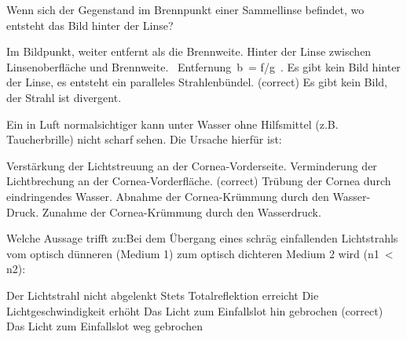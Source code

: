 \documentclass[11pt]{exam}
\begin{document}
\setlength{\voffset}{-0.5in}
\setlength{\headsep}{5pt}

\hspace{2mm}
 \hspace{5mm}
\vspace{4mm}

\begin{questions}

\question Wenn sich der Gegenstand im Brennpunkt einer Sammellinse befindet, wo entsteht das Bild hinter der Linse?

\begin{choices}
	\choice Im Bildpunkt, weiter entfernt als die Brennweite.
	\choice Hinter der Linse zwischen Linsenoberfläche und Brennweite.
	\choice  Entfernung b = f/g .
	\choice Es gibt kein Bild hinter der Linse, es entsteht ein paralleles Strahlenbündel. (correct)
	\choice Es gibt kein Bild, der Strahl ist divergent.
\end{choices}

\vspace{3mm}\question Ein in Luft normalsichtiger kann unter Wasser ohne Hilfsmittel (z.B. Taucherbrille) nicht scharf sehen. Die Ursache hierfür ist:

\begin{choices}
	\choice Verstärkung der Lichtstreuung an der Cornea-Vorderseite.
	\choice Verminderung der Lichtbrechung an der Cornea-Vorderfläche. (correct)
	\choice Trübung der Cornea durch eindringendes Wasser.
	\choice Abnahme der Cornea-Krümmung durch den Wasser-Druck.
	\choice Zunahme der Cornea-Krümmung durch den Wasserdruck.
\end{choices}

\vspace{3mm}\question Welche Aussage trifft zu:Bei dem Übergang eines schräg einfallenden Lichtstrahls vom optisch dünneren (Medium 1) zum optisch dichteren Medium 2 wird (n1 < n2):

\begin{choices}
	\choice Der Lichtstrahl nicht abgelenkt
	\choice Stets Totalreflektion erreicht
	\choice Die Lichtgeschwindigkeit erhöht
	\choice Das Licht zum Einfallslot hin gebrochen (correct)
	\choice Das Licht zum Einfallslot weg gebrochen
\end{choices}


\end{questions}
\end{document}
